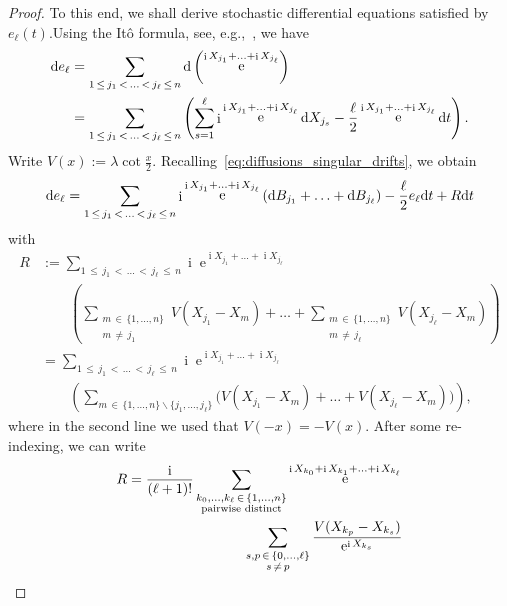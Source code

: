 \documentclass[10pt]{amsart}
\theoremstyle{definition}\newtheorem{defi}[theo]{Definition}\newtheorem{rema}[theo]{Remark}\newtheorem{exam}[theo]{Example}\newtheorem{exem}[theo]{Example}\newtheorem{nota}[theo]{Notation}
\DeclareMathOperator{\eee}{e}
\DeclareMathOperator{\ii}{i}
\newcommand*\dint{\text{\normalfont d}}
\begin{document}
\begin{proof}
To this end, we shall derive stochastic differential equations satisfied by $e_\ell(t)$.\linebreak Using the Itô formula, see, e.g.,~\cite[Chapter~IV, Theorem~(3.3)]{revuz_yor_book}, we have
\begin{align*}
\dint e_\ell &=
\sum_{1\,\leq\,j_1\,<\,\ldots\,<\,j_\ell\,\leq\,n} \dint \left(\eee^{\ii X_{j_1} +\ldots + \ii X_{j_\ell}}\right)\\
&=
\sum_{1\,\leq\,j_1\,<\,\ldots\,<\,j_\ell\,\leq\,n}
\left(\sum_{s=1}^\ell \ii \eee^{\ii X_{j_1} +\ldots + \ii X_{j_\ell}}\dint X_{j_s} -\frac {\ell}2 \eee^{\ii X_{j_1} +\ldots + \ii X_{j_\ell}} \dint t
\right).
\end{align*}
Write $V(x) := \lambda \cot \frac x2$. Recalling~\eqref{eq:diffusions_singular_drifts}, we obtain
\begin{equation}\label{eq:elem_symm_SDE1}
\dint e_\ell = \sum_{1\,\leq\,j_1\,<\,\ldots\,<\,j_\ell\,\leq\,n} \ii \eee^{\ii X_{j_1} +\ldots + \ii X_{j_\ell}} \left(\dint B_{j_1} +\ldots + \dint B_{j_\ell} \right) - \frac \ell 2 e_\ell \dint t + R \dint t
\end{equation}
with
\begin{align*}
R &:=
\sum_{1\,\leq\,j_1\,<\,\ldots\,<\,j_\ell\,\leq\,n} \ii \eee^{\ii X_{j_1} +\ldots + \ii X_{j_\ell}}\\
&\qquad \left(\sum_{\substack{m\,\in\,\{1,\ldots, n\}\\ m\,\neq\,j_1}} V(X_{j_1} - X_m) + \ldots + \sum_{\substack{m\,\in\,\{1,\ldots, n\}\\ m\,\neq\, j_\ell}} V(X_{j_\ell} - X_m)\right)\\
&=
\sum_{1\,\leq\,j_1\,<\,\ldots\,<\,j_\ell\,\leq\,n} \ii \eee^{\ii X_{j_1} +\ldots + \ii X_{j_\ell}}\\
&\qquad\left(\sum_{m\,\in\,\{1,\ldots, n\}\backslash \{j_1,\ldots, j_\ell\}} \Big(V(X_{j_1} - X_m) + \ldots + V(X_{j_\ell} - X_m)\Big) \right),
\end{align*}
where in the second line we used that $V(-x) = -V(x)$. After some re-indexing, we can write
\begin{align*}
R &=
\frac{\ii}{(\ell+1)!}\sum_{\substack{k_0,\ldots, k_\ell\,\in\,\{1,\ldots, n\}\\
\text{pairwise distinct}}}\eee^{\ii X_{k_0} + \ii X_{k_1} + \ldots + \ii X_{k_\ell}}\\
&\mkern150mu\sum_{\substack{s,p\,\in\,\{0,\ldots,\ell\}\\s\,\neq\,p}} \frac{V(X_{k_p} - X_{k_s})}{\eee^{\ii X_{k_s}}}\\

\end{align*}
\end{proof}
\end{document}

